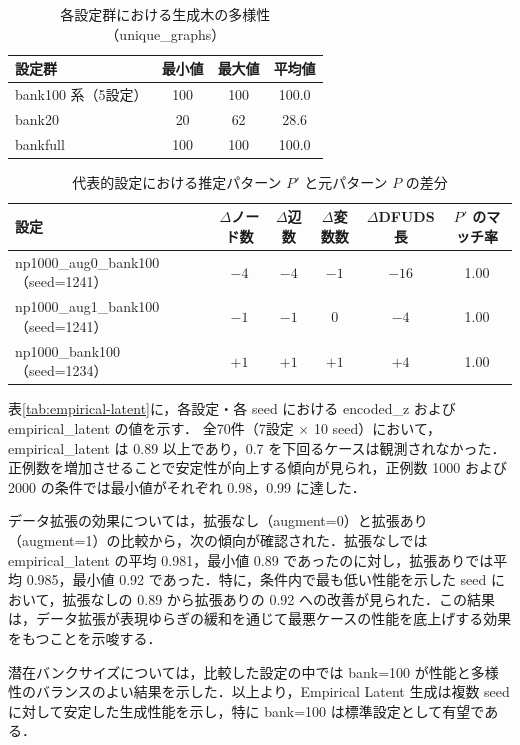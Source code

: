 \documentclass[submit,techrep,noauthor]{ipsj}
\begin{document}
\begin{table}[t]
\centering
\small
\caption{各設定群における生成木の多様性（unique\_graphs）}
\label{tab:unique-graphs}
\begin{tabular}{lccc}
\toprule
設定群 & 最小値 & 最大値 & 平均値 \\
\midrule
bank100 系（5設定） & 100 & 100 & 100.0 \\
bank20              & 20  & 62  & 28.6 \\
bankfull            & 100 & 100 & 100.0 \\
\bottomrule
\end{tabular}
\end{table}

\begin{table}[t]
\centering
\small
\caption{代表的設定における推定パターン $P'$ と元パターン $P$ の差分}
\label{tab:pattern-diff}
\begin{tabular}{lccccc}
\toprule
設定 & $\Delta$ノード数 & $\Delta$辺数 & $\Delta$変数数 & $\Delta$DFUDS長 & $P'$ のマッチ率 \\
\midrule
np1000\_aug0\_bank100（seed=1241） & $-4$ & $-4$ & $-1$ & $-16$ & 1.00 \\
np1000\_aug1\_bank100（seed=1241） & $-1$ & $-1$ & $0$  & $-4$  & 1.00 \\
np1000\_bank100（seed=1234）       & $+1$ & $+1$ & $+1$ & $+4$  & 1.00 \\
\bottomrule
\end{tabular}
\end{table}

表\ref{tab:empirical-latent}に，各設定・各 seed における encoded\_z および empirical\_latent の値を示す．
全70件（7設定 × 10 seed）において，empirical\_latent は 0.89 以上であり，0.7 を下回るケースは観測されなかった．正例数を増加させることで安定性が向上する傾向が見られ，正例数 1000 および 2000 の条件では最小値がそれぞれ 0.98，0.99 に達した．

データ拡張の効果については，拡張なし（augment=0）と拡張あり（augment=1）の比較から，次の傾向が確認された．拡張なしでは empirical\_latent の平均 0.981，最小値 0.89 であったのに対し，拡張ありでは平均 0.985，最小値 0.92 であった．特に，条件内で最も低い性能を示した seed において，拡張なしの 0.89 から拡張ありの 0.92 への改善が見られた．この結果は，データ拡張が表現ゆらぎの緩和を通じて最悪ケースの性能を底上げする効果をもつことを示唆する．

潜在バンクサイズについては，比較した設定の中では bank=100 が性能と多様性のバランスのよい結果を示した．以上より，Empirical Latent 生成は複数 seed に対して安定した生成性能を示し，特に bank=100 は標準設定として有望である．
\end{document}
